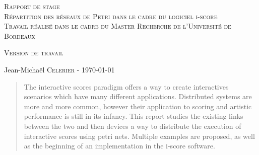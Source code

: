 \begin{titlepage}
  \begin{center}

	\begin{spacing}{1.7}
    \textsc{\Huge Rapport de stage ~ \\ Répartition des réseaux de Petri dans le cadre du logiciel i-score}\\[1cm]
    \textsc{\huge Travail réalisé dans le cadre du Master Recherche de l'Université de Bordeaux}\\[1cm]
    \end{spacing}
    \textsc{\Large Version de travail}
    
  \end{center}
  
  \begin{flushbottom}
   \begin{flushleft}
    Jean-Michaël \textsc{Celerier} - \today \\
   \end{flushleft}
  \end{flushbottom}
\end{titlepage}
\clearpage

\begin{abstract}
	 The interactive scores paradigm offers a way to create interactives scenarios which have many different applications. Distributed systems are more and more common, however their application to scoring and artistic performance is still in its infancy. This report studies the existing links between the two and then devices a way to distribute the execution of interactive scores using petri nets. Multiple examples are proposed, as well as the beginning of an implementation in the i-score software.
\end{abstract}

\tableofcontents
\listoffigures
\listoftables